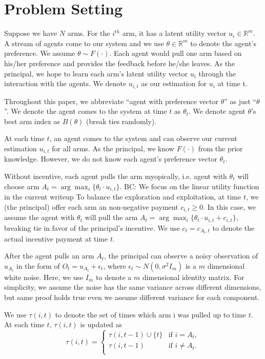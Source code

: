 \documentclass{article}
\newcommand{\bccomment}[1]{{\color{blue}BC: #1}}
\begin{document}
\section{Problem Setting}
\label{sec:prob}

Suppose we have $N$ arms. For the $i^{th}$ arm, it has a latent utility vector $u_i\in \mathbb{R}^{m}$. 
A stream of agents come to our system and we use $\theta\in \mathbb{R}^{m}$ to denote the agent's preference. We assume $\theta\sim F(\cdot)$.
Each agent would pull one arm based on his/her preference and provides the feedback before he/she leaves.
As the principal, we hope to learn each arm's latent utility vector $u_i$ through the interaction with the agents. We denote $u_{i,t}$ as our estimation for $u_i$ at time t. 

Throughout this paper, we abbreviate ``agent with preference vector $\theta$'' as just ``$\theta$''. We denote the agent comes to the system at time $t$ as $\theta_{t}$. We denote agent $\theta$'s best arm index as $B(\theta)$ (break ties randomly). 

At each time $t$, an agent comes to the system and can observe our current estimation $u_{i,t}$ for all arms. As the principal, we know $F(\cdot)$ from the prior knowledge. However, we do not know each agent's preference vector $\theta_t$.

Without incentive, each agent pulls the arm myopically, i.e. agent with $\theta_t$ will choose arm $A_t=\arg\max_{i}\{\theta_t\cdot u_{i,t}\}$. \bccomment{We focus on the linear utility function in the current writeup} To balance the exploration and exploitation, at time $t$, we (the principal) offer each arm an non-negative payment $c_{i,t}\geq 0$. In this case, we assume the agent with $\theta_t$ will pull the arm $A_t=\arg\max_{i}\{\theta_t\cdot u_{i,t}+c_{i,t}\}$, breaking tie in favor of the principal's incentive. We use $c_t=c_{A_{t},t}$ to denote the actual incentive payment at time $t$.

After the agent pulls an arm $A_t$, the principal can observe a noisy observation of $u_{A_{t}}$ in the form of $O_t=u_{A_{t}}+\epsilon_{t}$, where $\epsilon_t\sim N(0, \sigma^2 I_{m})$ is a $m$ dimensional white noise. Here, we use $I_m$ to denote a $m$ dimensional identity matrix. For simplicity, we assume the noise has the same variance across different dimensions, but same proof holds true even we assume different variance for each component.


We use $\tau(i,t)$ to denote the set of times which arm i was pulled up to time $t$. At each time $t$, $\tau(i,t)$ is updated as
\[ \tau(i,t) =
\begin{cases}
\tau(i,t-1) \cup \{t\}       & \text{if } i = A_t, \\
\tau(i,t-1)  & \text{if } i \neq A_t. \\
\end{cases}
\]
\end{document}
